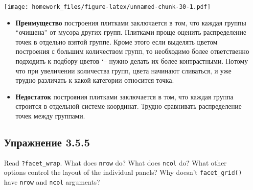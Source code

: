 \documentclass[]{book}
\begin{document}
\texttt{[image: homework\_files/figure-latex/unnamed-chunk-30-1.pdf]}

\begin{itemize}
\item
  \textbf{Преимущество} построения плитками заключается в том, что
  каждая группы ``очищена'' от мусора других групп. Плитками проще
  оценить распределение точек в отдельно взятой группе. Кроме этого если
  выделять цветом построения с большим количеством групп, то необходимо
  более ответственно подходить к подбору цветов `-- нужно делать их
  более контрастными. Потому что при увеличении количества групп, цвета
  начинают сливаться, и уже трудно различать к какой категории относится
  точка.
\item
  \textbf{Недостаток} построяния плитками заключается в том, что каждая
  группа строится в отдельной системе координат. Трудно сравнивать
  распределение точек между группами.
\end{itemize}

\subsection*{Упражнение 3.5.5}\label{-3.5.5}

Read \texttt{?facet\_wrap}. What does \texttt{nrow} do? What does
\texttt{ncol} do? What other options control the layout of the
individual panels? Why doesn't \texttt{facet\_grid()} have \texttt{nrow}
and \texttt{ncol} arguments?


\end{document}
